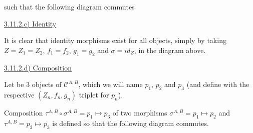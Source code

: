 \documentclass[12pt, letterpaper, twoside]{report}
\begin{document}
such that the following diagram commutes



\vspace{5mm}
\underline{3.11.2.c) Identity}

It is clear that identity morphisms exist for all objects, simply by taking $Z = Z_1 = Z_2$, $f_1 = f_2$, $g_1 = g_2$ and $\sigma = id_Z$, in the diagram above.

\vspace{5mm}
\underline{3.11.2.d) Composition}

Let be 3 objects of $\mathcal{C}^{A,B}$, which we will name $p_1$, $p_2$ and $p_3$ (and define with the respective $(Z_n, f_n, g_n)$ triplet for $p_n$).

Composition $\tau^{A, B} \circ \sigma^{A, B} = p_1 \mapsto p_3$ of two morphisms $\sigma^{A, B} = p_1 \mapsto p_2$ and $\tau^{A, B} = p_2 \mapsto p_3$ is defined so that the following diagram commutes.

\end{document}
